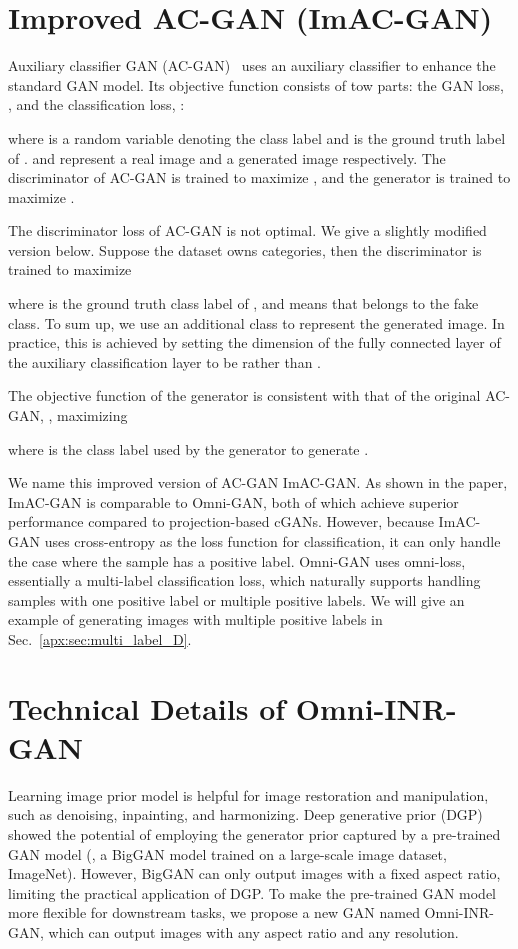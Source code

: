 \documentclass[paper_2425.tex]{subfiles}
\begin{document}
\section{Improved AC-GAN (ImAC-GAN)}
\label{apx:sec:imacgan}

Auxiliary classifier GAN (AC-GAN)~\cite{odena2017Conditional} uses an auxiliary classifier to enhance the standard GAN model. Its objective function consists of tow parts: the GAN loss, , and the classification loss, :


where  is a random variable denoting the class label and  is the ground truth label of .  and  represent a real image and a generated image respectively. The discriminator  of AC-GAN is trained to maximize , and the generator is trained to maximize .

The discriminator loss of AC-GAN is not optimal. We give a slightly modified version below. Suppose the dataset owns  categories, then the discriminator is trained to maximize

where  is the ground truth class label of , and  means that  belongs to the fake class. To sum up, we use an additional class to represent the generated image. In practice, this is achieved by setting the dimension of the fully connected layer of the auxiliary classification layer to be  rather than .

The objective function of the generator is consistent with that of the original AC-GAN, \ie, maximizing

where  is the class label used by the generator to generate .

We name this improved version of AC-GAN ImAC-GAN. As shown in the paper, ImAC-GAN is comparable to Omni-GAN, both of which achieve superior performance compared to projection-based cGANs. However, because ImAC-GAN uses cross-entropy as the loss function for classification, it can only handle the case where the sample has a positive label. Omni-GAN uses omni-loss, essentially a multi-label classification loss, which naturally supports handling samples with one positive label or multiple positive labels. We will give an example of generating images with multiple positive labels in Sec.~\ref{apx:sec:multi_label_D}.

\section{Technical Details of Omni-INR-GAN}
\label{apx:sec:omni_inr_gan}


Learning image prior model is helpful for image restoration and manipulation, such as denoising, inpainting, and harmonizing. Deep generative prior (DGP)~\cite{pan2020Exploiting} showed the potential of employing the generator prior captured by a pre-trained GAN model (\ie, a BigGAN model trained on a large-scale image dataset, ImageNet). However, BigGAN can only output images with a fixed aspect ratio, limiting the practical application of DGP. To make the pre-trained GAN model more flexible for downstream tasks, we propose a new GAN named Omni-INR-GAN, which can output images with any aspect ratio and any resolution.
\end{document}
